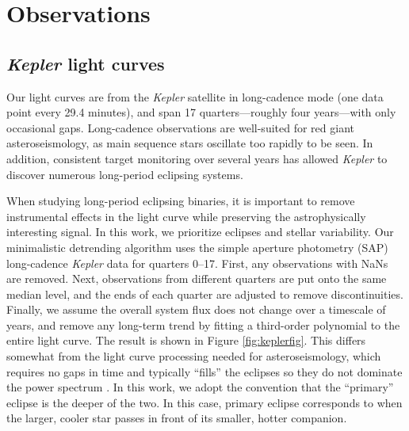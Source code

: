 \section{Observations}\label{data}

\subsection{\emph{Kepler} light curves}\label{kepler}
Our light curves are from the \emph{Kepler} satellite in long-cadence mode (one data point every 29.4 minutes), and span 17 quarters---roughly four years---with only occasional gaps. Long-cadence observations are well-suited for red giant asteroseismology, as main sequence stars oscillate too rapidly to be seen. In addition, consistent target monitoring over several years has allowed \emph{Kepler} to discover numerous long-period eclipsing systems.

When studying long-period eclipsing binaries, it is important to remove instrumental effects in the light curve while preserving the astrophysically interesting signal. In this work, we prioritize eclipses and stellar variability. Our minimalistic detrending algorithm uses the simple aperture photometry (SAP) long-cadence \emph{Kepler} data for quarters 0--17. First, any observations with NaNs are removed. Next, observations from different quarters are put onto the same median level, and the ends of each quarter are adjusted to remove discontinuities. Finally, we assume the overall system flux does not change over a timescale of years, and remove any long-term trend by fitting a third-order polynomial to the entire light curve. The result is shown in Figure \ref{fig:keplerfig}. This differs somewhat from the light curve processing needed for asteroseismology, which requires no gaps in time and typically ``fills'' the eclipses so they do not dominate the power spectrum \citep{gau14}. In this work, we adopt the convention that the ``primary'' eclipse is the deeper of the two. In this case, primary eclipse corresponds to when the larger, cooler star passes in front of its smaller, hotter companion.
